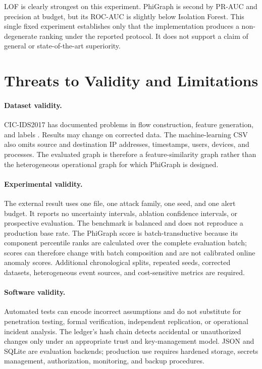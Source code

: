 \documentclass[11pt]{article}
\begin{document}
LOF is clearly strongest on this experiment. PhiGraph is second by PR-AUC and
precision at budget, but its ROC-AUC is slightly below Isolation Forest.
This single fixed experiment establishes only that the implementation produces
a non-degenerate ranking under the reported protocol. It does not support a
claim of general or state-of-the-art superiority.

\section{Threats to Validity and Limitations}

\paragraph{Dataset validity.}
CIC-IDS2017 has documented problems in flow construction, feature generation,
and labels \cite{liu2022errors,lanvin2022errors}. Results may change on
corrected data. The machine-learning CSV also omits source and destination IP
addresses, timestamps, users, devices, and processes. The evaluated graph is
therefore a feature-similarity graph rather than the heterogeneous operational
graph for which PhiGraph is designed.

\paragraph{Experimental validity.}
The external result uses one file, one attack family, one seed, and one alert
budget. It reports no uncertainty intervals, ablation confidence intervals, or
prospective evaluation. The benchmark is balanced and does not reproduce a
production base rate. The PhiGraph score is batch-transductive because its
component percentile ranks are calculated over the complete evaluation batch;
scores can therefore change with batch composition and are not calibrated
online anomaly scores. Additional chronological splits, repeated seeds,
corrected datasets, heterogeneous event sources, and cost-sensitive metrics
are required.

\paragraph{Software validity.}
Automated tests can encode incorrect assumptions and do not substitute for
penetration testing, formal verification, independent replication, or
operational incident analysis. The ledger's hash chain detects accidental or
unauthorized changes only under an appropriate trust and key-management model.
JSON and SQLite are evaluation backends; production use requires hardened
storage, secrets management, authorization, monitoring, and backup procedures.
\end{document}
